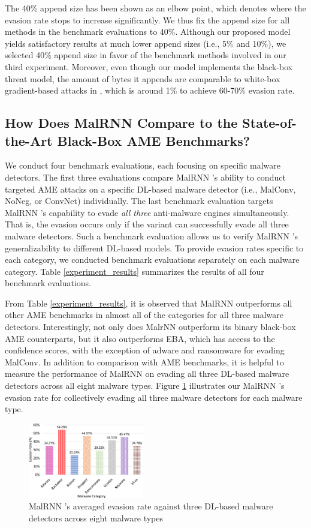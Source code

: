 \documentclass[letterpaper]{article}
\newcommand{\malrnn}{M\lowercase{a}lRNN }
\begin{document}
The 40\% append size has been shown as an elbow point, which denotes where the evasion rate stops to increase significantly. We thus fix the append size for all methods in the benchmark evaluations to 40\%. Although our proposed model yields satisfactory results at much lower append sizes (i.e., 5\% and 10\%), we selected 40\% append size in favor of the benchmark methods involved in our third experiment. Moreover, even though our model implements the black-box threat model, the amount of bytes it appends are comparable to white-box gradient-based attacks in \cite{kolosnjaji2018adversarial}, which is around 1\% to achieve 60-70\% evasion rate.

\subsection{How Does MalRNN Compare to the State-of-the-Art Black-Box AME Benchmarks?}
    
We conduct four benchmark evaluations, each focusing on specific malware detectors. The first three evaluations compare \malrnn's ability to conduct targeted AME attacks on a specific DL-based malware detector (i.e., MalConv, NoNeg, or ConvNet) individually. The last benchmark evaluation targets \malrnn's capability to evade \textit{all three} anti-malware engines simultaneously. That is, the evasion occurs only if the variant can successfully evade all three malware detectors. Such a benchmark evaluation allows us to verify \malrnn's generalizability to different DL-based models. To provide evasion rates specific to each category, we conducted benchmark evaluations separately on each malware category. Table \ref{experiment_results} summarizes the results of all four benchmark evaluations. 

From Table \ref{experiment_results}, it is observed that \malrnn outperforms all other AME benchmarks in almost all of the categories for all three malware detectors. Interestingly, not only does MalrNN outperform its binary black-box AME counterparts, but it also outperforms EBA, which has access to the confidence scores, with the exception of adware and ransomware for evading MalConv. In addition to comparison with AME benchmarks, it is helpful to measure the performance of \malrnn on evading all three DL-based malware detectors across all eight malware types. Figure \ref{experiment_graph} illustrates our \malrnn's evasion rate for collectively evading all three malware detectors for each malware type.


\begin{figure}[h]
    \centering
    \includegraphics[width=0.45\textwidth]{Final_Evasion_Rate_Illustration.png}
    \caption{\malrnn's averaged evasion rate against three DL-based malware detectors across eight malware types}
    \label{experiment_graph}
\end{figure}
\end{document}
